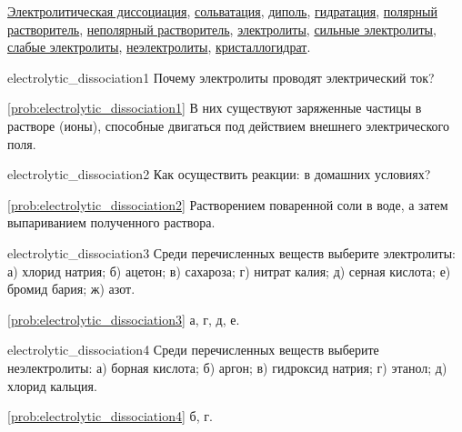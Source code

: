 \begin{termlist}
    \hyperref[term:electrolytic_dissociation]{Электролитическая диссоциация},
    \hyperref[term:solvation]{сольватация},
    \hyperref[term:dipole]{диполь},
    \hyperref[term:hydration]{гидратация},
    \hyperref[term:polar_solvent]{полярный растворитель},
    \hyperref[term:nonpolar_solvent]{неполярный растворитель},
    \hyperref[term:electrolytes]{электролиты},
    \hyperref[term:strong_electrolytes]{сильные электролиты},
    \hyperref[term:weak_electrolytes]{слабые электролиты},
    \hyperref[term:nonelectrolytes]{неэлектролиты},
    \hyperref[term:crystallohydrate]{кристаллогидрат}.
\end{termlist}

\begin{problem}{}{electrolytic_dissociation1}
    Почему электролиты проводят электрический ток?
    \begin{sol}{\ref{prob:electrolytic_dissociation1}}
        В них существуют заряженные частицы в растворе (ионы), способные двигаться под действием внешнего электрического поля.
    \end{sol}
\end{problem}

\begin{problem}{}{electrolytic_dissociation2}
    Как осуществить реакции:
    в домашних условиях?
    \begin{sol}{\ref{prob:electrolytic_dissociation2}}
        Растворением поваренной соли в воде, а затем выпариванием полученного раствора.
    \end{sol}
\end{problem}

\begin{problem}{}{electrolytic_dissociation3}
    Среди перечисленных веществ выберите электролиты: а) хлорид натрия; б) ацетон; в) сахароза; г) нитрат калия; д) серная кислота; е) бромид бария; ж) азот.
    \begin{sol}{\ref{prob:electrolytic_dissociation3}}
        а, г, д, е.
    \end{sol}
\end{problem}

\begin{problem}{}{electrolytic_dissociation4}
    Среди перечисленных веществ выберите неэлектролиты: а) борная кислота; б) аргон; в) гидроксид натрия; г) этанол; д) хлорид кальция.
    \begin{sol}{\ref{prob:electrolytic_dissociation4}}
        б, г.
    \end{sol}
\end{problem}

